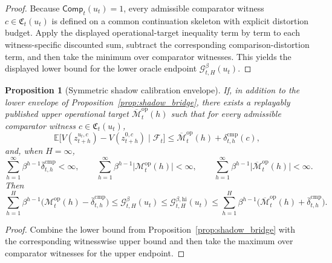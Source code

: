 \documentclass[11pt]{article}
\newtheorem{proposition}[theorem]{Proposition}
\theoremstyle{definition}
\newcommand{\E}{\mathbb{E}}
\newcommand{\1}{\mathbf{1}}
\begin{document}
\begin{proof}
Because $\mathsf{Comp}_t(u_t)=1$, every admissible comparator witness $c\in\mathfrak C_t(u_t)$ is defined on a common continuation skeleton with explicit distortion budget. Apply the displayed operational-target inequality term by term to each witness-specific discounted sum, subtract the corresponding comparison-distortion term, and then take the minimum over comparator witnesses. This yields the displayed lower bound for the lower oracle endpoint $\mathcal G_{t,H}^{\beta}(u_t)$.
\end{proof}

\begin{proposition}[Symmetric shadow calibration envelope]\label{prop:shadow_bridge_symmetric}
If, in addition to the lower envelope of Proposition~\ref{prop:shadow_bridge}, there exists a replayably published upper operational target $\overline{\mathcal M}_t^{\mathrm{op}}(h)$ such that for every admissible comparator witness $c\in\mathfrak C_t(u_t)$,
\[
\E\bigl[V(z_{t+h}^{u_t,c})-V(z_{t+h}^{0,c})\mid \mathcal F_t\bigr]
\le
\overline{\mathcal M}_t^{\mathrm{op}}(h)+\delta_{t,h}^{\mathrm{cmp}}(c),
\]
and, when $H=\infty$,
\[
\sum_{h=1}^{\infty}\beta^{h-1}\bar\delta_{t,h}^{\mathrm{cmp}}<\infty,
\qquad
\sum_{h=1}^{\infty}\beta^{h-1}\bigl|\mathcal M_t^{\mathrm{op}}(h)\bigr|<\infty,
\qquad
\sum_{h=1}^{\infty}\beta^{h-1}\bigl|\overline{\mathcal M}_t^{\mathrm{op}}(h)\bigr|<\infty.
\]
Then
\[
\sum_{h=1}^{H}\beta^{h-1}\bigl(\mathcal M_t^{\mathrm{op}}(h)-\bar\delta_{t,h}^{\mathrm{cmp}}\bigr)
\le
\mathcal G_{t,H}^{\beta}(u_t)
\le
\mathcal G_{t,H}^{\beta,\mathrm{hi}}(u_t)
\le
\sum_{h=1}^{H}\beta^{h-1}\bigl(\overline{\mathcal M}_t^{\mathrm{op}}(h)+\bar\delta_{t,h}^{\mathrm{cmp}}\bigr).
\]
\end{proposition}

\begin{proof}
Combine the lower bound from Proposition~\ref{prop:shadow_bridge} with the corresponding witnesswise upper bound and then take the maximum over comparator witnesses for the upper endpoint.
\end{proof}
\end{document}
